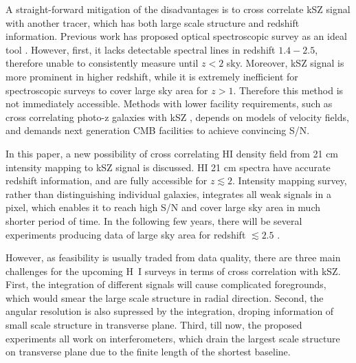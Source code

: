 A straight-forward mitigation of the disadvantages is to cross correlate 
kSZ signal with another tracer, which has both large scale structure and redshift information. 
Previous work has proposed optical spectroscopic survey as an ideal tool \cite{Hand12,Shao11,Li14}. 
However, first, it lacks detectable spectral lines in redshift $1.4-2.5$, 
therefore unable to consistently measure until $z<2$ sky. 
Moreover, kSZ signal is more prominent in higher redshift, 
while it is extremely inefficient for spectroscopic surveys to cover 
large sky area for $z>1$. 
Therefore this method is not immediately accessible. 
%
Methods with lower facility requirements, such as 
cross correlating photo-z galaxies with kSZ \cite{Hill16,Ferraro16}, 
depends on models of velocity fields, 
and demands next generation CMB facilities to achieve 
convincing S/N.

In this paper, a new possibility of cross correlating HI density field from 21 cm intensity mapping to kSZ signal is discussed. 
HI 21 cm spectra have accurate redshift information, 
and are fully accessible for $z\lesssim2$.  
Intensity mapping survey, 
rather than distinguishing individual galaxies, 
integrates all weak signals in a pixel,  
which enables it to reach high S/N and cover large sky area 
in much shorter period of time. 
In the following few years, there will be several experiments 
producing data of large sky area for redshift $\lesssim2.5$ 
\cite{2014SPIE.9145E..22B,2015ApJ...798...40X, HIRAX}.

However, as feasibility is usually traded from data quality, 
there are three main challenges for the upcoming H~I surveys  
in terms of cross correlation with kSZ. 
First, the integration of different signals will cause complicated foregrounds, 
which would smear the large scale structure in radial direction\cite{DiMatteo04,Masui13}. 
Second, the angular resolution is also supressed by the integration, 
droping information of small scale structure in transverse plane. 
Third, till now, the proposed experiments all work on interferometers, 
which drain the largest scale structure on transverse plane  
due to the finite length of the shortest baseline. 

